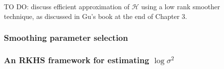 \documentclass[12pt]{article}
\newcommand{\hilbert}{\mathcal{H}}
\theoremstyle{definition}
\begin{document}
\bigskip
TO DO: discuss efficient approximation of $\hilbert$ using a low rank smoother technique, as discussed in Gu's book at the end of Chapter 3. \citet{kim2004smoothing}
\bigskip

\subsubsection{Smoothing parameter selection}

%
%



\subsubsection{An RKHS framework for estimating $\log \sigma^2$}




\end{document}
